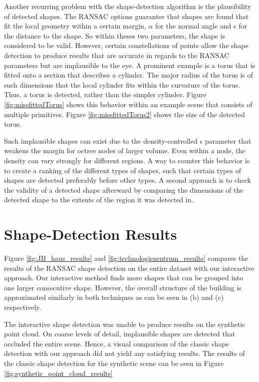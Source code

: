 Another recurring problem with the shape-detection algorithm is the plausibility of detected shapes. The RANSAC options guarantee that shapes are found that fit the local geometry within a certain margin, $\alpha$ for the normal angle and $\epsilon$ for the distance to the shape. So within theses two parameters, the shape is considered to be valid. However, certain constellations of points allow the shape detection to produce results that are accurate in regards to the RANSAC parameters but are implausible to the eye. A prominent example is a torus that is fitted onto a section that describes a cylinder. The major radius of the torus is of such dimensions that the local cylinder fits within the curvature of the torus. Thus, a torus is detected, rather than the simpler cylinder. Figure \ref{fig:missfittedTorus} shows this behavior within an example scene that consists of multiple primitives. Figure \ref{fig:missfittedTorus2} shows the size of the detected torus. 

\par

Such implausible shapes can exist due to the density-controlled $\epsilon$ parameter that weakens the margin for octree nodes of larger volume. Even within a node, the density can vary strongly for different regions. A way to counter this behavior is to create a ranking of the different types of shapes, such that certain types of shapes are detected preferably before other types. A second approach is to check the validity of a detected shape afterward by comparing the dimensions of the detected shape to the extents of the region it was detected in. 


\section{Shape-Detection Results}
\label{sec:shape_detection_results}

Figure \ref{fig:JB_haus_results} and \ref{fig:technologiezentrum_results} compares the results of the RANSAC shape detection on the entire dataset with our interactive approach. Our interactive method finds more shapes that can be grouped into one larger consecutive shape. However, the overall structure of the building is approximated similarly in both techniques as can be seen in (b) and (c) respectively. 

The interactive shape detection was unable to produce results on the synthetic point cloud. On coarse levels of detail, implausible shapes are detected that occluded the entire scene. Hence, a visual comparison of the classic shape detection with our approach did not yield any satisfying results. The results of the classic shape detection for the synthetic scene can be seen in Figure \ref{fig:synthetic_point_cloud_results}


